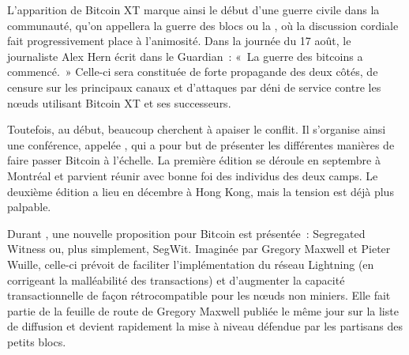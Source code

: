 L'apparition de Bitcoin XT marque ainsi le début d'une guerre civile dans la communauté, qu'on appellera la guerre des blocs ou la , où la discussion cordiale fait progressivement place à l'animosité. Dans la journée du 17 août, le journaliste Alex Hern écrit dans le Guardian~: «~La guerre des bitcoins a commencé.~» Celle-ci sera constituée de forte propagande des deux côtés, de censure sur les principaux canaux et d'attaques par déni de service contre les nœuds utilisant Bitcoin XT et ses successeurs. 

Toutefois, au début, beaucoup cherchent à apaiser le conflit. Il s'organise ainsi une conférence, appelée , qui a pour but de présenter les différentes manières de faire passer Bitcoin à l'échelle. La première édition se déroule en septembre à Montréal et parvient réunir avec bonne foi des individus des deux camps. Le deuxième édition a lieu en décembre à Hong Kong, mais la tension est déjà plus palpable.

Durant , une nouvelle proposition pour Bitcoin est présentée~: Segregated Witness ou, plus simplement, SegWit. Imaginée par Gregory Maxwell et Pieter Wuille, celle-ci prévoit de faciliter l'implémentation du réseau Lightning (en corrigeant la malléabilité des transactions) et d'augmenter la capacité transactionnelle de façon rétrocompatible pour les nœuds non miniers. Elle fait partie de la feuille de route de Gregory Maxwell publiée le même jour sur la liste de diffusion et devient rapidement la mise à niveau défendue par les partisans des petits blocs.

